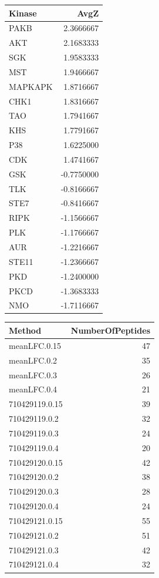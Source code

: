 \documentclass[
  letterpaper,
  DIV=11,
  numbers=noendperiod]{scrreport}
\begin{document}
\begin{longtable}[]{@{}lr@{}}
\toprule()
Kinase & AvgZ \\
\midrule()
\endhead
PAKB & 2.3666667 \\
AKT & 2.1683333 \\
SGK & 1.9583333 \\
MST & 1.9466667 \\
MAPKAPK & 1.8716667 \\
CHK1 & 1.8316667 \\
TAO & 1.7941667 \\
KHS & 1.7791667 \\
P38 & 1.6225000 \\
CDK & 1.4741667 \\
GSK & -0.7750000 \\
TLK & -0.8166667 \\
STE7 & -0.8416667 \\
RIPK & -1.1566667 \\
PLK & -1.1766667 \\
AUR & -1.2216667 \\
STE11 & -1.2366667 \\
PKD & -1.2400000 \\
PKCD & -1.3683333 \\
NMO & -1.7116667 \\
\bottomrule()
\end{longtable}

\begin{longtable}[]{@{}lr@{}}
\toprule()
Method & NumberOfPeptides \\
\midrule()
\endhead
meanLFC.0.15 & 47 \\
meanLFC.0.2 & 35 \\
meanLFC.0.3 & 26 \\
meanLFC.0.4 & 21 \\
710429119.0.15 & 39 \\
710429119.0.2 & 32 \\
710429119.0.3 & 24 \\
710429119.0.4 & 20 \\
710429120.0.15 & 42 \\
710429120.0.2 & 38 \\
710429120.0.3 & 28 \\
710429120.0.4 & 24 \\
710429121.0.15 & 55 \\
710429121.0.2 & 51 \\
710429121.0.3 & 42 \\
710429121.0.4 & 32 \\
\bottomrule()
\end{longtable}
\end{document}
